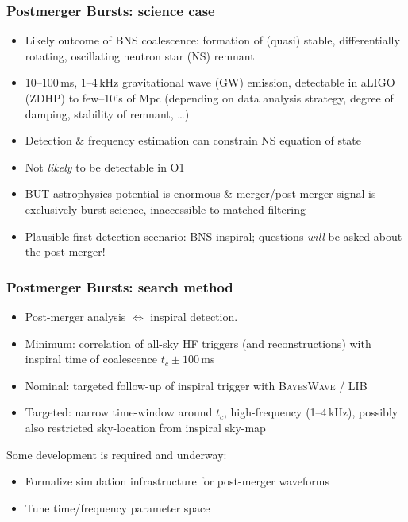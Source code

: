 \documentclass{beamer}
\def\gw#1{gravitational wave#1 (GW#1)\gdef\gw{GW}}
\def\ns#1{neutron star#1 (NS#1)\gdef\ns{NS}}
\begin{document}
\begin{frame}
    \frametitle{Postmerger Bursts: science case}
    \begin{itemize}
        \item Likely outcome of BNS coalescence: formation of (quasi) stable,
            differentially rotating, oscillating \ns{} remnant
        \item 10--100\,ms, 1--4\,kHz \gw{} emission, detectable in aLIGO (ZDHP) to
            few--10's of Mpc (depending on data analysis strategy, degree of
            damping, stability of remnant, \dots)
        \item Detection \& frequency estimation can constrain \ns{} equation of
            state
        \item Not \emph{likely} to be detectable in O1
        \item BUT astrophysics potential is enormous \& merger/post-merger signal is
            exclusively burst-science, inaccessible to matched-filtering
        \item Plausible first detection scenario: BNS inspiral; questions
            \emph{will} be asked about the post-merger!
    \end{itemize}
\end{frame}

\begin{frame}
    \frametitle{Postmerger Bursts: search method}
    \begin{itemize}
        \item Post-merger analysis $\iff$ inspiral detection.
        \item Minimum: correlation of all-sky HF triggers (and reconstructions)
            with inspiral time of coalescence $t_c \pm 100$\,ms
        \item Nominal: targeted follow-up of inspiral trigger with
            \textsc{BayesWave} / \textsc{LIB}
        \item Targeted: narrow time-window around $t_c$, high-frequency
            (1--4\,kHz), possibly also restricted sky-location from inspiral
            sky-map
    \end{itemize}
    Some development is required and underway:
    \begin{itemize}
        \item Formalize simulation infrastructure for post-merger waveforms
        \item Tune time/frequency parameter space
    \end{itemize}
\end{frame}
\end{document}
